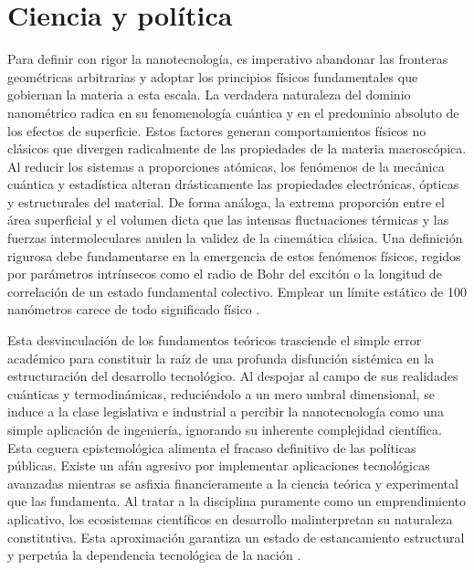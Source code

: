 \section{Ciencia y política}

Para definir con rigor la nanotecnología, es imperativo abandonar las fronteras
geométricas arbitrarias y adoptar los principios físicos fundamentales que
gobiernan la materia a esta escala. La verdadera naturaleza del
dominio nanométrico radica en su fenomenología cuántica y en el predominio
absoluto de los efectos de superficie. Estos factores generan
comportamientos físicos no clásicos que divergen radicalmente de las
propiedades de la materia macroscópica. Al reducir los sistemas a
proporciones atómicas, los fenómenos de la mecánica cuántica y estadística
alteran drásticamente las propiedades electrónicas, ópticas y estructurales del
material. De forma análoga, la extrema proporción entre el área
superficial y el volumen dicta que las intensas fluctuaciones térmicas y las
fuerzas intermoleculares anulen la validez de la cinemática clásica.
Una definición rigurosa debe fundamentarse en la emergencia de estos fenómenos
físicos, regidos por parámetros intrínsecos como el radio de Bohr del excitón o
la longitud de correlación de un estado fundamental colectivo. Emplear
un límite estático de 100 nanómetros carece de todo significado físico
\cite{smalleyChemistryLoveNanobots2001}.

Esta desvinculación de los fundamentos teóricos trasciende el simple error
académico para constituir la raíz de una profunda disfunción sistémica en la
estructuración del desarrollo tecnológico. Al despojar al campo de sus
realidades cuánticas y termodinámicas, reduciéndolo a un mero umbral
dimensional, se induce a la clase legislativa e industrial a percibir la
nanotecnología como una simple aplicación de ingeniería, ignorando su inherente
complejidad científica. Esta ceguera epistemológica alimenta el fracaso
definitivo de las políticas públicas. Existe un afán agresivo por implementar
aplicaciones tecnológicas avanzadas mientras se asfixia financieramente a la
ciencia teórica y experimental que las fundamenta. Al tratar a la
disciplina puramente como un emprendimiento aplicativo, los ecosistemas
científicos en desarrollo malinterpretan su naturaleza constitutiva.
Esta aproximación garantiza un estado de estancamiento estructural y perpetúa la
dependencia tecnológica de la nación \cite{jonesSoftMachinesNanotechnology2004}.
